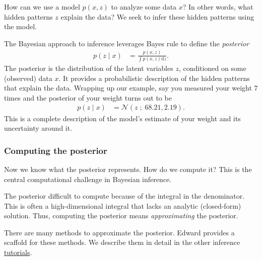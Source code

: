 How can we use a model $p(x,z)$ to analyze some data $x$? In other words,
what hidden patterns $z$ explain the data? We seek to infer these
hidden patterns using the model.

The Bayesian approach to inference leverages Bayes rule to define the 
\emph{posterior}
\begin{align*}
  p(z \mid x)
  &=
  \frac{p(x,z)}{\int p(x,z) \text{d}z}.
\end{align*}
The posterior is the distribution of the latent variables $z$, conditioned on
some (observed) data $x$. It provides a probabilistic description of the hidden
patterns that explain the data. Wrapping up our example, say you measured your
weight $7$ times and the posterior of your weight turns out to be
\begin{align*}
  p(z \mid x) &= \mathcal{N}(z\;;\; 68.21, 2.19).
\end{align*}
This is a complete description of the model's estimate of your weight and its
uncertainty around it.


\subsubsection{Computing the posterior}

Now we know what the posterior represents. How do we compute it? This is the
central computational challenge in Bayesian inference.

The posterior difficult to compute because of the integral in the denominator.
This is often a high-dimensional integral that lacks an analytic (closed-form)
solution. Thus, computing the posterior means \emph{approximating} the
posterior.

There are many methods to approximate the posterior. Edward provides a scaffold
for these methods. We describe them in detail in the other inference 
\href{tutorials.html}{tutorials}.
